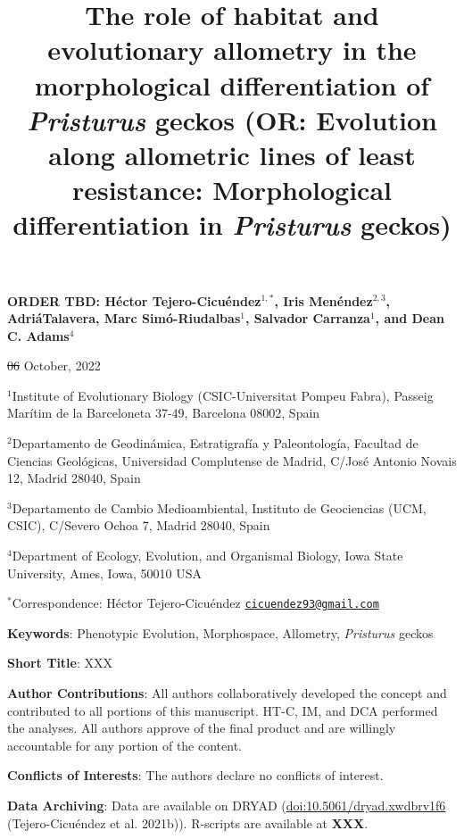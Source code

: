 \documentclass[
  11pt,
]{article}
\title{The role of habitat and evolutionary allometry in the
morphological differentiation of \emph{Pristurus} geckos (OR: Evolution
along allometric lines of least resistance: Morphological
differentiation in \emph{Pristurus} geckos)}
\author{}
\date{\vspace{-2.5em}}
\providecommand{\DIFaddtex}[1]{{\protect\color{blue}\uwave{#1}}} %
\providecommand{\DIFdeltex}[1]{{\protect\color{red}\sout{#1}}}                      %
\providecommand{\DIFaddbegin}{} %
\providecommand{\DIFaddend}{} %
\providecommand{\DIFdelbegin}{} %
\providecommand{\DIFdelend}{} %
\providecommand{\DIFadd}[1]{\texorpdfstring{\DIFaddtex{#1}}{#1}} %
\providecommand{\DIFdel}[1]{\texorpdfstring{\DIFdeltex{#1}}{}} %
\newcommand{\DIFscaledelfig}{0.5}
\newlength{\DIFdelgraphicswidth} %
\newlength{\DIFdelgraphicsheight} %
\newcommand{\DIFaddincludegraphics}[2][]{{\color{blue}\fbox{\DIFOincludegraphics[#1]{#2}}}} %
\newcommand{\DIFdelincludegraphics}[2][]{%
\sbox{\DIFdelgraphicsbox}{\DIFOincludegraphics[#1]{#2}}%
\settoboxwidth{\DIFdelgraphicswidth}{\DIFdelgraphicsbox} %
\settoboxtotalheight{\DIFdelgraphicsheight}{\DIFdelgraphicsbox} %
\scalebox{\DIFscaledelfig}{%
\parbox[b]{\DIFdelgraphicswidth}{\usebox{\DIFdelgraphicsbox}\\[-\baselineskip] \rule{\DIFdelgraphicswidth}{0em}}\llap{\resizebox{\DIFdelgraphicswidth}{\DIFdelgraphicsheight}{%
\setlength{\unitlength}{\DIFdelgraphicswidth}%
\begin{picture}(1,1)%
\thicklines\linethickness{2pt} %
{\color[rgb]{1,0,0}\put(0,0){\framebox(1,1){}}}%
{\color[rgb]{1,0,0}\put(0,0){\line( 1,1){1}}}%
{\color[rgb]{1,0,0}\put(0,1){\line(1,-1){1}}}%
\end{picture}%
}\hspace*{3pt}}} %
} %
\DeclareRobustCommand{\DIFaddbegin}{\DIFOaddbegin \let\includegraphics\DIFaddincludegraphics} %
\DeclareRobustCommand{\DIFaddend}{\DIFOaddend \let\includegraphics\DIFOincludegraphics} %
\DeclareRobustCommand{\DIFdelbegin}{\DIFOdelbegin \let\includegraphics\DIFdelincludegraphics} %
\DeclareRobustCommand{\DIFdelend}{\DIFOaddend \let\includegraphics\DIFOincludegraphics} %
\begin{document}
\maketitle

\begin{center}
\textbf{ORDER TBD:  H{\'{e}}ctor Tejero-Cicu{\'{e}}ndez$^{1,*}$,  Iris Men{\'{e}}ndez$^{2,3}$, Adri{\'{a}}\DIFaddbegin \DIFadd{n }\DIFaddend Talavera, Marc Sim{\'{o}}-Riudalbas$^{1}$, Salvador Carranza$^{1}$, and Dean C. Adams$^{4}$}
\end{center}

\begin{center}\DIFdelbegin \DIFdel{06 }\DIFdelend \DIFaddbegin \DIFadd{13 }\DIFaddend October, 2022\end{center}

\(^{1}\)Institute of Evolutionary Biology (CSIC-Universitat Pompeu
Fabra), Passeig Marítim de la Barceloneta 37-49, Barcelona 08002, Spain

\(^{2}\)Departamento de Geodinámica, Estratigrafía y Paleontología,
Facultad de Ciencias Geológicas, Universidad Complutense de Madrid,
C/José Antonio Novais 12, Madrid 28040, Spain

\(^{3}\)Departamento de Cambio Medioambiental, Instituto de Geociencias
(UCM, CSIC), C/Severo Ochoa 7, Madrid 28040, Spain

\(^{4}\)Department of Ecology, Evolution, and Organismal Biology, Iowa
State University, Ames, Iowa, 50010 USA

\(^{*}\)Correspondence: Héctor Tejero-Cicuéndez
\href{mailto:cicuendez93@gmail.com}{\nolinkurl{cicuendez93@gmail.com}}

\hfill\break

\textbf{Keywords}: Phenotypic Evolution, Morphospace, Allometry,
\emph{Pristurus} geckos \hfill\break

\textbf{Short Title}: XXX \hfill\break

\textbf{Author Contributions}: All authors collaboratively developed the
concept and contributed to all portions of this manuscript. HT-C, IM,
and DCA performed the analyses. All authors approve of the final product
and are willingly accountable for any portion of the
content.\hfill\break

\textbf{Conflicts of Interests}: The authors declare no conflicts of
interest.\hfill\break

\textbf{Data Archiving}: Data are available on DRYAD
(\url{doi:10.5061/dryad.xwdbrv1f6} (Tejero-Cicuéndez et al. 2021b)).
R-scripts are available at \textbf{XXX}. \hfill\break
\end{document}
